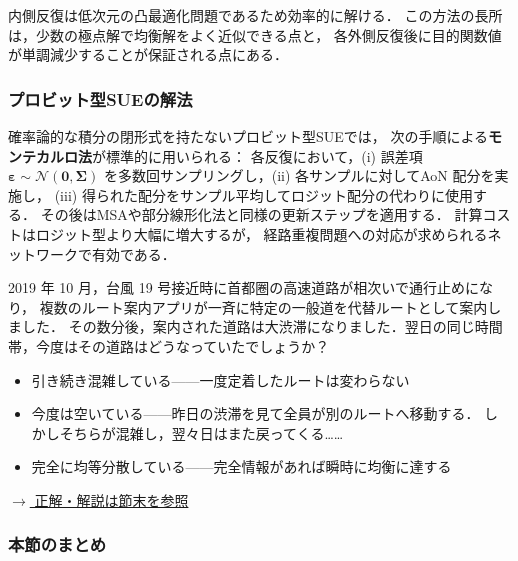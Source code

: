 内側反復は低次元の凸最適化問題であるため効率的に解ける．
この方法の長所は，少数の極点解で均衡解をよく近似できる点と，
各外側反復後に目的関数値が単調減少することが保証される点にある\cite{Sheffi1985}．

\subsubsection*{プロビット型SUEの解法}

確率論的な積分の閉形式を持たないプロビット型SUEでは，
次の手順による\textbf{モンテカルロ法}が標準的に用いられる\cite{Daganzo1977}：
各反復において，(i) 誤差項 $\boldsymbol{\varepsilon} \sim \mathcal{N}(\mathbf{0}, \boldsymbol{\Sigma})$
を多数回サンプリングし，(ii) 各サンプルに対してAoN 配分を実施し，
(iii) 得られた配分をサンプル平均してロジット配分の代わりに使用する．
その後はMSAや部分線形化法と同様の更新ステップを適用する．
計算コストはロジット型より大幅に増大するが，
経路重複問題への対応が求められるネットワークで有効である\cite{Daganzo1977,Sheffi1985}．

\begin{example}[title={クイズ 6：ナビが全員に「今すぐ迂回せよ」と告げたら，翌日はどうなる？}]
2019 年 10 月，台風 19 号接近時に首都圈の高速道路が相次いで通行止めになり，
複数のルート案内アプリが一斉に特定の一般道を代替ルートとして案内しました．
その数分後，案内された道路は大渋滞になりました．翌日の同じ時間帯，今度はその道路はどうなっていたでしょうか？
\begin{itemize}
  \item[(ア)] 引き続き混雑している——一度定着したルートは変わらない
  \item[(イ)] 今度は空いている——昨日の渋滞を見て全員が別のルートへ移動する．
             しかしそちらが混雑し，翌々日はまた戻ってくる……
  \item[(ウ)] 完全に均等分散している——完全情報があれば瞬時に均衡に達する
\end{itemize}
\hyperref[ans:q6]{$\rightarrow$ 正解・解説は節末を参照}
\end{example}

\subsubsection*{本節のまとめ}

